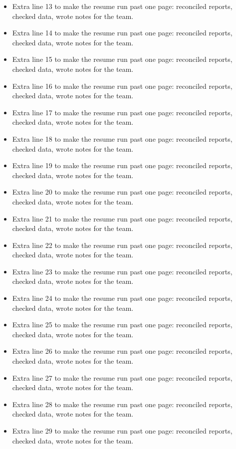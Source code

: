\documentclass[11pt,letterpaper]{article}
\begin{document}
\begin{itemize}
  \item Extra line 13 to make the resume run past one page: reconciled reports, checked data, wrote notes for the team.
  \item Extra line 14 to make the resume run past one page: reconciled reports, checked data, wrote notes for the team.
  \item Extra line 15 to make the resume run past one page: reconciled reports, checked data, wrote notes for the team.
  \item Extra line 16 to make the resume run past one page: reconciled reports, checked data, wrote notes for the team.
  \item Extra line 17 to make the resume run past one page: reconciled reports, checked data, wrote notes for the team.
  \item Extra line 18 to make the resume run past one page: reconciled reports, checked data, wrote notes for the team.
  \item Extra line 19 to make the resume run past one page: reconciled reports, checked data, wrote notes for the team.
  \item Extra line 20 to make the resume run past one page: reconciled reports, checked data, wrote notes for the team.
  \item Extra line 21 to make the resume run past one page: reconciled reports, checked data, wrote notes for the team.
  \item Extra line 22 to make the resume run past one page: reconciled reports, checked data, wrote notes for the team.
  \item Extra line 23 to make the resume run past one page: reconciled reports, checked data, wrote notes for the team.
  \item Extra line 24 to make the resume run past one page: reconciled reports, checked data, wrote notes for the team.
  \item Extra line 25 to make the resume run past one page: reconciled reports, checked data, wrote notes for the team.
  \item Extra line 26 to make the resume run past one page: reconciled reports, checked data, wrote notes for the team.
  \item Extra line 27 to make the resume run past one page: reconciled reports, checked data, wrote notes for the team.
  \item Extra line 28 to make the resume run past one page: reconciled reports, checked data, wrote notes for the team.
  \item Extra line 29 to make the resume run past one page: reconciled reports, checked data, wrote notes for the team.

\end{itemize}
\end{document}
